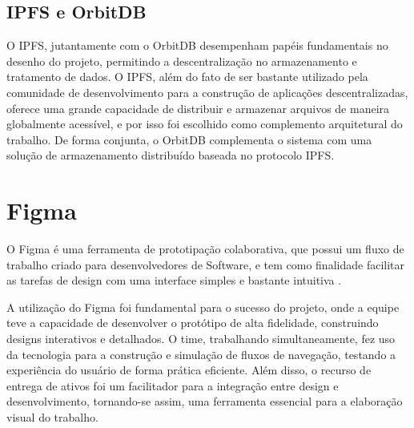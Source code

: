 \subsection{IPFS e OrbitDB}
O IPFS, jutantamente com o OrbitDB desempenham papéis fundamentais no desenho do projeto, permitindo a descentralização no armazenamento e tratamento de dados. O IPFS, além do fato de ser bastante utilizado pela comunidade de desenvolvimento para a construção de aplicações descentralizadas, oferece uma grande capacidade de distribuir e armazenar arquivos de maneira globalmente acessível, e por isso foi escolhido como complemento arquitetural do trabalho. De forma conjunta, o OrbitDB complementa o sistema com uma solução de armazenamento distribuído baseada no protocolo IPFS.


\section{Figma}
O Figma é uma ferramenta de prototipação colaborativa, que possui um fluxo de trabalho criado para desenvolvedores de Software, e tem como finalidade facilitar as tarefas de design com uma interface simples e bastante intuitiva \cite{figma2025}.

A utilização do Figma foi fundamental para o sucesso do projeto, onde a equipe teve a capacidade de desenvolver o protótipo de alta fidelidade, construindo designs interativos e detalhados. O time, trabalhando simultaneamente, fez uso da tecnologia para a construção e simulação de fluxos de navegação, testando a experiência do usuário de forma prática eficiente. Além disso, o recurso de entrega de ativos foi um facilitador para a integração entre design e desenvolvimento, tornando-se assim, uma ferramenta essencial para a elaboração visual do trabalho.
